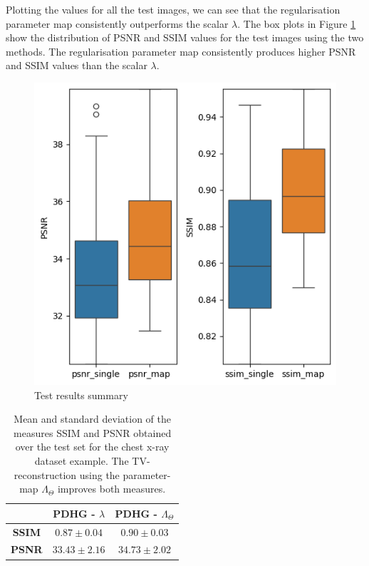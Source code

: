 \documentclass[12pt]{article}
\begin{document}
Plotting the values for all the test images, we can see that the regularisation parameter map consistently outperforms the scalar $\lambda$.
The box plots in Figure \ref{fig:box_plots} show the distribution of PSNR and SSIM values for the test images
using the two methods.
The regularisation parameter map consistently produces higher PSNR and SSIM values than the scalar $\lambda$.





\begin{figure}[h]
  \centering
  \includegraphics[width=0.5\linewidth]{images//chest_xray/box_plots_1.png}
  \caption{Test results summary}
  \label{fig:box_plots}
\end{figure}


\begin{table}[h!]

\centering
\begin{tabular}{c|c c}
 & \textbf{PDHG -} $\lambda$ & \textbf{PDHG -} $\Lambda_{\Theta}$ \\
\hline
\textbf{SSIM} & $0.87 \pm 0.04$ & $\mathbf{0.90} \pm 0.03$ \\
\textbf{PSNR} & $33.43 \pm 2.16$ & $\mathbf{34.73} \pm 2.02$ \\
\end{tabular}

\caption{Mean and standard deviation of the measures SSIM and PSNR obtained over the test set for the chest x-ray dataset example. 
The TV-reconstruction using the parameter-map $\Lambda_{\Theta}$ improves both measures.
}

\label{table:1}

\end{table}
\end{document}
